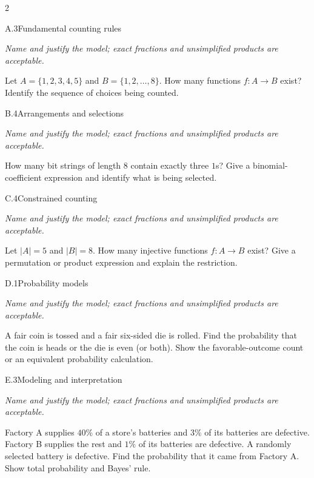 \documentclass[9pt]{extarticle}
\begin{document}
\begin{multicols}{2}
\begin{CoreProblem}{A.3}{Fundamental counting rules}
{\scriptsize\textit{Name and justify the model; exact fractions and unsimplified products are acceptable.}\par}
Let $A=\{1,2,3,4,5\}$ and $B=\{1,2,\ldots,8\}$. How many functions
    $f:A\to B$ exist? Identify the sequence of choices being counted.
\end{CoreProblem}
\begin{CoreProblem}{B.4}{Arrangements and selections}
{\scriptsize\textit{Name and justify the model; exact fractions and unsimplified products are acceptable.}\par}
How many bit strings of length 8 contain exactly three $1$s? Give a
    binomial-coefficient expression and identify what is being selected.
\end{CoreProblem}
\begin{CoreProblem}{C.4}{Constrained counting}
{\scriptsize\textit{Name and justify the model; exact fractions and unsimplified products are acceptable.}\par}
Let $|A|=5$ and $|B|=8$. How many injective functions $f:A\to B$
    exist? Give a permutation or product expression and explain the restriction.
\end{CoreProblem}
\columnbreak
\begin{CoreProblem}{D.1}{Probability models}
{\scriptsize\textit{Name and justify the model; exact fractions and unsimplified products are acceptable.}\par}
A fair coin is tossed and a fair six-sided die is rolled. Find the
    probability that the coin is heads or the die is even (or both). Show the
    favorable-outcome count or an equivalent probability calculation.
\end{CoreProblem}
\begin{CoreProblem}{E.3}{Modeling and interpretation}
{\scriptsize\textit{Name and justify the model; exact fractions and unsimplified products are acceptable.}\par}
Factory A supplies $40\%$ of a store's batteries and $3\%$ of its
    batteries are defective. Factory B supplies the rest and $1\%$ of its
    batteries are defective. A randomly selected battery is defective. Find the
    probability that it came from Factory A. Show total probability and Bayes'
    rule.
\end{CoreProblem}
\end{multicols}
\CoreWorkArea
\FormBreak
\end{document}
